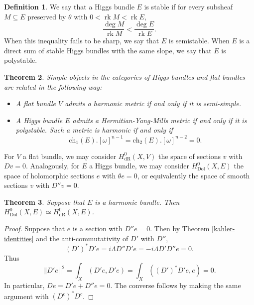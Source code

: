 \documentclass[letterpaper, 12pt]{article}
\DeclareMathOperator{\rk}{\text{rk}}
\newtheorem{theorem}{Theorem}
\theoremstyle{definition}
\newtheorem{definition}[theorem]{Definition}
\begin{document}
\begin{definition}
    We say that a Higgs bundle $E$ is stable if for every subsheaf $M \subseteq E$ preserved by $\theta$ with $0 < \rk M < \rk E$,
    \begin{equation*}
        \frac{\deg M}{\rk M} < \frac{\deg E}{\rk E}.
    \end{equation*}
    When this inequality fails to be sharp, we say that $E$ is semistable. When $E$ is a direct sum of stable Higgs bundles with the same slope, we say that $E$ is polystable.
\end{definition}

\begin{theorem} Simple objects in the categories of Higgs bundles and flat bundles are related in the following way:
    \begin{itemize}
        \item[(1)]
        A flat bundle $V$ admits a harmonic metric if and only if it is semi-simple.
        \item[(2)]
        A Higgs bundle $E$ admits a Hermitian-Yang-Mills metric if and only if it is polystable. Such a metric is harmonic if and only if 
        \begin{equation} \label{eq-ch1-ch2-vanishing}
            \text{ch}_1(E).[\omega]^{n-1} = \text{ch}_2(E).[\omega]^{n-2} = 0.
        \end{equation}
    \end{itemize}
\end{theorem}

For $V$ a flat bundle, we may consider $H^0_{\text{dR}}(X, V)$ the space of sections $v$ with $Dv = 0$. Analogously, for $E$ a Higgs bundle, we may consider $H^0_{\text{Dol}}(X, E)$ the space of holomorphic sections $e$ with $\theta e = 0$, or equivalently the space of smooth sections $v$ with $D'' v = 0$.
\begin{theorem} \label{dol-dr-global-sections}
    Suppose that $E$ is a harmonic bundle. Then $H^0_{\text{Dol}}(X, E) \simeq H^0_{\text{dR}}(X, E)$.
\end{theorem}
\begin{proof}
Suppose that $e$ is a section with $D'' e = 0$. Then by Theorem \ref{kahler-identities} and the anti-commutativity of $D'$ with $D''$,
\begin{equation*}
    (D')^* D' e = i \Lambda D'' D' e = -i\Lambda D' D'' e = 0.
\end{equation*}
Thus
\begin{equation*}
    ||D' e||^2 = \int_X (D' e, D' e) = \int_X ((D')^* D' e, e) = 0.
\end{equation*}
In particular, $De = D'e + D''e = 0$. The converse follows by making the same argument with $(D^c)^* D^c$.
\end{proof}
\end{document}
